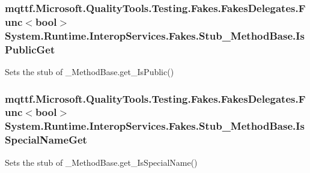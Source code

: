 \hypertarget{class_system_1_1_runtime_1_1_interop_services_1_1_fakes_1_1_stub___method_base_a965ac3a9333b2373ed7cb6a4ef412722}{
\subsubsection[{Is\-Public\-Get}]{\setlength{\rightskip}{0pt plus 5cm}mqttf.\-Microsoft.\-Quality\-Tools.\-Testing.\-Fakes.\-Fakes\-Delegates.\-Func$<$bool$>$ System.\-Runtime.\-Interop\-Services.\-Fakes.\-Stub\-\_\-\-Method\-Base.\-Is\-Public\-Get}}\label{class_system_1_1_runtime_1_1_interop_services_1_1_fakes_1_1_stub___method_base_a965ac3a9333b2373ed7cb6a4ef412722}


Sets the stub of \-\_\-\-Method\-Base.\-get\-\_\-\-Is\-Public()

\hypertarget{class_system_1_1_runtime_1_1_interop_services_1_1_fakes_1_1_stub___method_base_a69e48a79edc7c76d38c64d9f5e5f4604}{
\subsubsection[{Is\-Special\-Name\-Get}]{\setlength{\rightskip}{0pt plus 5cm}mqttf.\-Microsoft.\-Quality\-Tools.\-Testing.\-Fakes.\-Fakes\-Delegates.\-Func$<$bool$>$ System.\-Runtime.\-Interop\-Services.\-Fakes.\-Stub\-\_\-\-Method\-Base.\-Is\-Special\-Name\-Get}}\label{class_system_1_1_runtime_1_1_interop_services_1_1_fakes_1_1_stub___method_base_a69e48a79edc7c76d38c64d9f5e5f4604}


Sets the stub of \-\_\-\-Method\-Base.\-get\-\_\-\-Is\-Special\-Name()

